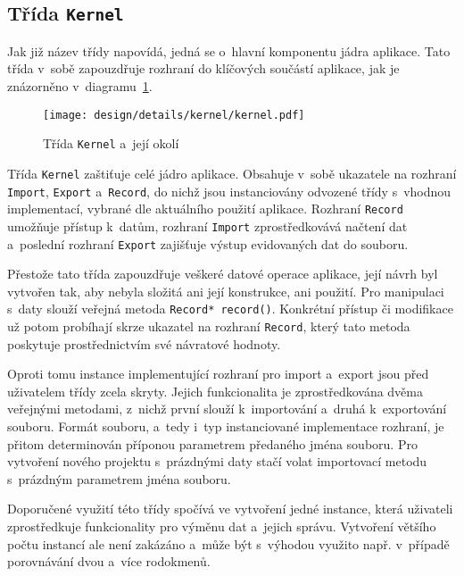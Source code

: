 		\subsection*{Třída \texttt{Kernel}}
		Jak již název třídy napovídá, jedná se o~hlavní komponentu jádra aplikace. Tato třída v~sobě zapouzdřuje rozhraní do klíčových součástí aplikace, jak je znázorněno v~diagramu~\ref{fig:designDetailKernel}. \par
		\begin{figure}[H]
			\centering
			\texttt{[image: design/details/kernel/kernel.pdf]}
			\caption{Třída \texttt{Kernel} a~její okolí}
			\label{fig:designDetailKernel}
		\end{figure}
		Třída \texttt{Kernel} zaštiťuje celé jádro aplikace. Obsahuje v~sobě ukazatele na rozhraní \texttt{Import}, \texttt{Export} a~\texttt{Record}, do nichž jsou instanciovány odvozené třídy s~vhodnou implementací, vybrané dle aktuálního použití aplikace. Rozhraní \texttt{Record} umožňuje přístup k~datům, rozhraní \texttt{Import} zprostředkovává načtení dat a~poslední rozhraní \texttt{Export} zajišťuje výstup evidovaných dat do souboru.\par
		Přestože tato třída zapouzdřuje veškeré datové operace aplikace, její návrh byl vytvořen tak, aby nebyla složitá ani její konstrukce, ani použití. Pro manipulaci s~daty slouží veřejná metoda \texttt{Record* record()}. Konkrétní přístup či modifikace už potom probíhají skrze ukazatel na rozhraní \texttt{Record}, který tato metoda poskytuje prostřednictvím své návratové hodnoty.\par
		Oproti tomu instance implementující rozhraní pro import a~export jsou před uživatelem třídy zcela skryty. Jejich funkcionalita je zprostředkována dvěma veřejnými metodami, z~nichž první slouží k~importování a~druhá k~exportování souboru. Formát souboru, a~tedy i~typ instanciované implementace rozhraní, je přitom determinován příponou parametrem předaného jména souboru. Pro vytvoření nového projektu s~prázdnými daty stačí volat importovací metodu s~prázdným parametrem jména souboru.\par
		Doporučené využití této třídy spočívá ve vytvoření jedné instance, která uživateli zprostředkuje funkcionality pro výměnu dat a~jejich správu. Vytvoření většího počtu instancí ale není zakázáno a~může být s~výhodou využito např. v~případě porovnávání dvou a~více rodokmenů.\par
		
